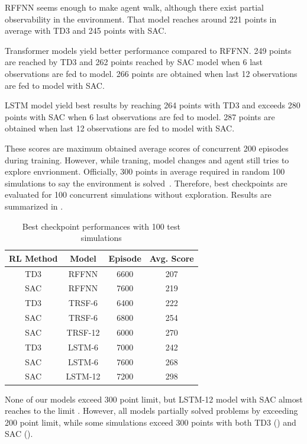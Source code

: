 RFFNN seems enough to make agent walk, although there exist partial observability in the environment. 
That model reaches around 221 points in average with TD3 and 245 points with SAC. 

Transformer models yield better performance compared to RFFNN. 249 points are reached by TD3 and 262 points reached by SAC model when 6 last observations are fed to model. 266 points are obtained when last 12 observations are fed to model with SAC.

LSTM model yield best results by reaching 264 points with TD3 and exceeds 280 points with SAC when 6 last observations are fed to model. 287 points are obtained when last 12 observations are fed to model with SAC. 

These scores are maximum obtained average scores of concurrent 200 episodes during training. 
However, while traning, model changes and agent still tries to explore envrionment. 
Officially, 300 points in average required in random 100 simulations to say the environment is solved~\cite{noauthor_gymleaderboard_2021}.
Therefore, best checkpoints are evaluated for 100 concurrent simulations without exploration. 
Results are summarized in .

\begin{table}
\begin{center}
	\caption{Best checkpoint performances with 100 test simulations}
	\begin{tabular}{||c c c c||} 
		\hline
		RL Method & Model & Episode & Avg. Score \\ [0.5ex] 
		\hline\hline
		TD3 & RFFNN & 6600 & 207 \\ 
		\hline
		SAC & RFFNN & 7600 & 219 \\
		\hline
		TD3 & TRSF-6 & 6400 & 222 \\
		\hline
		SAC & TRSF-6 & 6800 & 254 \\
		\hline
		SAC & TRSF-12 & 6000 & 270 \\
		\hline
		TD3 & LSTM-6 & 7000 & 242 \\
		\hline
		SAC & LSTM-6 & 7600 & 268 \\
		\hline
		SAC & LSTM-12 & 7200 & 298 \\ [1ex] 
		\hline
	\end{tabular}
	\label{table:ckpt_performance}
\end{center}
\end{table}

None of our models exceed 300 point limit, but LSTM-12 model with SAC almost reaches to the limit . 
However, all models partially solved problems by exceeding 200 point limit, while some simulations exceed 300 points with both TD3 () and SAC (). 

